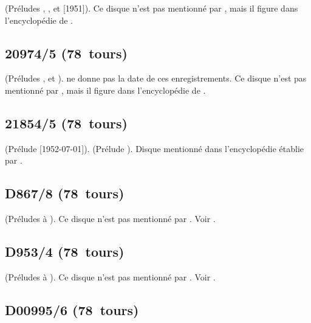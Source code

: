 \Scriabine{} (Préludes  ,  , 
 et   [1951]).
Ce disque n'est pas mentionné par \INikonovich{}
\citep[voir][]{Nikonovich11}, mais il figure dans l'encyclopédie de
\citet[supplément~II, p.~203]{CloughCuming}.

\subsection{20974/5 (78~tours)}

\Scriabine{} (Préludes  ,   et
 ).
\EWhite{} \citep[voir][p.~83]{White} ne donne pas la date de ces
enregistrements.
Ce disque n'est pas mentionné par \INikonovich{}
\citep[voir][]{Nikonovich11}, mais il figure dans l'encyclopédie de
\citet[supplément~II, p.~203]{CloughCuming}.

\subsection{21854/5 (78~tours)}

\Glazounov{} (Prélude   [1952-07-01]).
\Scriabine{} (Prélude  ).
Disque mentionné dans l'encyclopédie établie par \citet[supplément~III,
p.~177]{CloughCuming}.

\subsection{D867/8 (78~tours)}

\Scriabine{} (Préludes   à ).
Ce disque n'est pas mentionné par \INikonovich{}
\citep[voir][]{Nikonovich11}.
Voir \citet{Recordssu}.

\subsection{D953/4 (78~tours)}

\Chopin{} (Préludes   à ).
Ce disque n'est pas mentionné par \INikonovich{}
\citep[voir][]{Nikonovich11}.
Voir \citet{Recordssu}.

\subsection{D00995/6 (78~tours)}

